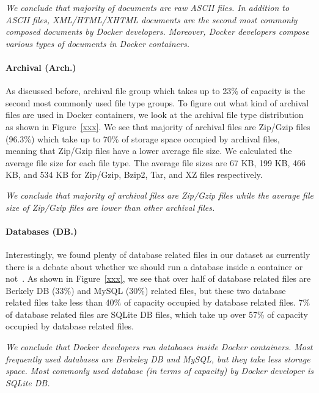 \textit{We conclude that majority of documents are raw ASCII files.
In addition to ASCII files, XML/HTML/XHTML documents are the second most commonly composed documents by Docker developers. 
Moreover, Docker developers compose various types of documents in Docker containers.}  


\paragraph{Archival (Arch.)}
As discussed before, archival file group which takes up to 23\% of capacity is the second most commonly used file type groups. To figure out what kind of archival files are used in Docker containers, we look at the archival file type distribution as shown in Figure~\ref{xxx}. We see that majority of archival files are Zip/Gzip files (96.3\%) which take up to 70\% of storage space occupied by archival files, meaning that Zip/Gzip files have a lower average file size. We calculated the average file size for each file type. 
The average file sizes are 67 KB, 199 KB, 466 KB, and 534 KB for Zip/Gzip, Bzip2, Tar, and XZ files respectively. 

\textit{We conclude that majority of archival files are Zip/Gzip files while the average file size of Zip/Gzip files are lower than other archival files.}

\paragraph{Databases (DB.)}

Interestingly, we found plenty of database related files in our dataset as currently there is a debate about whether we should run a database inside a container or not~\cite{xxx}. As shown in Figure~\ref{xxx}, we see that over half of database related files are Berkely DB (33\%) and MySQL (30\%) related files, but these two database related files take less than 40\% of capacity occupied by database related files. 7\% of database related files are SQLite DB files, which take up over 57\% of capacity occupied by database related files. 

\textit{We conclude that Docker developers run databases inside Docker containers. Most frequently used databases are Berkeley DB and MySQL, but they take less storage space. Most commonly used database (in terms of capacity) by Docker developer is SQLite DB.}
